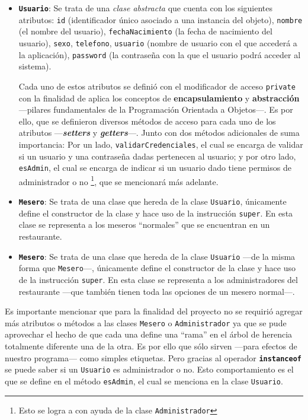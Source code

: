 \begin{itemize}
  \item \textbf{\texttt{Usuario}}: Se trata de una \textit{clase abstracta} 
  que cuenta con los siguientes atributos: \texttt{id} (identificador único 
    asociado a una instancia del objeto), \texttt{nombre} (el nombre del  
    usuario), \texttt{fechaNacimiento} (la fecha de nacimiento del usuario), 
    \texttt{sexo}, \texttt{telefono}, \texttt{usuario} (nombre de usuario con 
    el que accederá a la aplicación), \texttt{password} (la contraseña con la 
    que el usuario podrá acceder al sistema).

  Cada uno de estos atributos se definió con el modificador de acceso 
  \texttt{private} con la finalidad de aplica los conceptos de 
    \textbf{encapsulamiento} y \textbf{abstracción} ---pilares fundamentales 
    de la Programación Orientada a Objetos---. Es por ello, que se definieron 
    diversos métodos de acceso para cada uno de los atributos 
    ---\textbf{\textit{setters}} y \textbf{\textit{getters}}---. Junto con dos 
    métodos adicionales de suma importancia: Por un lado,  
    \texttt{validarCredenciales}, el cual se encarga de validar si un usuario  
    y una contraseña dadas pertenecen al usuario; y por otro lado, 
    \texttt{esAdmin}, el cual se encarga de indicar si un usuario dado tiene 
    permisos de administrador o no \footnote{Esto se logra a con ayuda de la 
    clase \texttt{Administrador}}, que se mencionará más adelante.

  \item \textbf{\texttt{Mesero}}: Se trata de una clase que hereda de la clase 
    \texttt{Usuario}, únicamente define el constructor de la clase y hace uso 
    de la instrucción \texttt{super}. En esta clase se representa a los 
    meseros ``normales'' que se encuentran en un restaurante.

  \item \textbf{\texttt{Mesero}}: Se trata de una clase que hereda de la clase 
    \texttt{Usuario} ---de la misma forma que \texttt{Mesero}---, únicamente 
    define el constructor de la clase y hace uso de la instrucción 
    \texttt{super}. En esta clase se representa a los administradores del 
    restaurante ---que también tienen toda las opciones de un mesero 
    normal---.
\end{itemize}

Es importante mencionar que para la finalidad del proyecto no se requirió 
agregar más atributos o métodos a las clases \texttt{Mesero} o 
\texttt{Administrador} ya que se pude aprovechar el hecho de que cada una 
define una ``rama'' en el árbol de herencia totalmente diferente una de la 
otra. Es por ello que sólo sirven ---para efectos de nuestro programa--- como 
simples etiquetas. Pero gracias al operador \texttt{\textbf{instanceof}} se 
puede saber si un \texttt{Usuario} es administrador o no. Esto comportamiento 
es el que se define en el método \texttt{esAdmin}, el cual se menciona en la 
clase \texttt{Usuario}.

